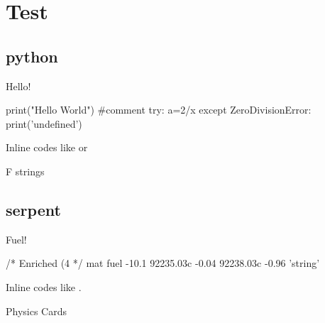 \chapter{Test}
\section{python}

\begin{code}\caption{Hello!} \begin{python}
    print("Hello World") #comment
    try:
        a=2/x
    except ZeroDivisionError:
        print('undefined')
\end{python}\label{code:hello}\end{code}

Inline codes like  or 

\begin{code}\caption{F strings}
\label{code:fstrings}\end{code}

\newpage
\section{serpent}

\begin{code}\caption{Fuel!} \begin{serpent}
    /*
    Enriched (4%
    */
    mat fuel     -10.1
    92235.03c    -0.04 
    92238.03c    -0.96
    'string'
\end{serpent}\label{code:fuel}\end{code}

Inline codes like .

\begin{code}\caption{Physics Cards}
    \label{code:physics}\end{code}